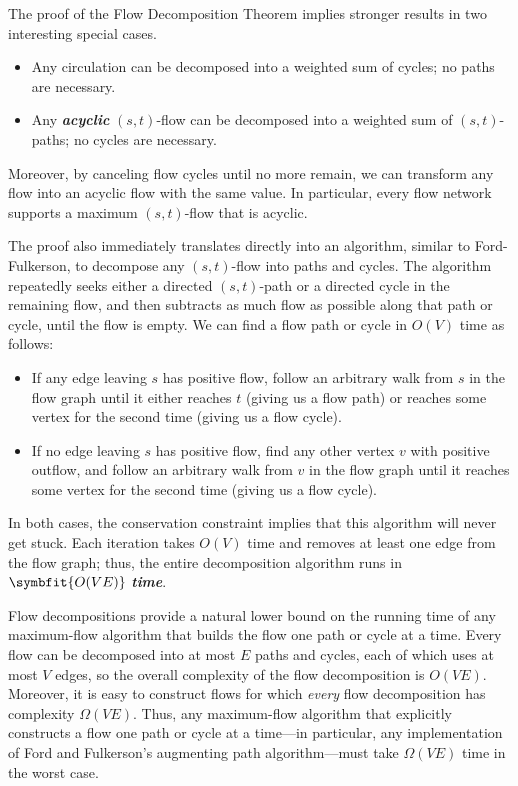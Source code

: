 The proof of the Flow Decomposition Theorem implies stronger results in two interesting special cases.
\begin{itemize}
\item Any circulation can be decomposed into a weighted sum of cycles; no paths are necessary.
\item Any \textbf{\textit{acyclic}} $(s,t)$-flow can be decomposed into a weighted sum of $(s,t)$-paths; no cycles are necessary.
\end{itemize}
\noindent Moreover, by canceling flow cycles until no more remain, we can transform any flow into an acyclic flow with the same value.
In particular, every flow network supports a maximum $(s,t)$-flow that is acyclic.

The proof also immediately translates directly into an algorithm, similar to Ford-Fulkerson, to decompose any $(s,t)$-flow into paths and cycles.
The algorithm repeatedly seeks either a directed $(s,t)$-path or a directed cycle in the remaining flow, and then subtracts as much flow as possible along that path or cycle, until the flow is empty.
We can find a flow path or cycle in $O(V)$ time as follows:
\begin{itemize}
\item If any edge leaving $s$ has positive flow, follow an arbitrary walk from $s$ in the flow graph until it either reaches $t$ (giving us a flow path) or reaches some vertex for the second time (giving us a flow cycle).
\item If no edge leaving $s$ has positive flow, find any other vertex $v$ with positive outflow, and follow an arbitrary walk from $v$ in the flow graph until it reaches some vertex for the second time (giving us a flow cycle).
\end{itemize}
\noindent In both cases, the conservation constraint implies that this algorithm will never get stuck.
Each iteration takes $O(V)$ time and removes at least one edge from the flow graph; thus, the entire decomposition algorithm runs in $\symbfit{O(VE)}$ \textbf{\textit{time}}.

Flow decompositions provide a natural lower bound on the running time of any maximum-flow algorithm that builds the flow one path or cycle at a time.
Every flow can be decomposed into at most $E$ paths and cycles, each of which uses at most $V$ edges, so the overall complexity of the flow decomposition is $O(VE)$.
Moreover, it is easy to construct flows for which \textit{every} flow decomposition has complexity $\Omega(VE)$.
Thus, any maximum-flow algorithm that explicitly constructs a flow one path or cycle at a time---in particular, any implementation of Ford and Fulkerson’s augmenting path algorithm---must take $\Omega(VE)$ time in the worst case.

